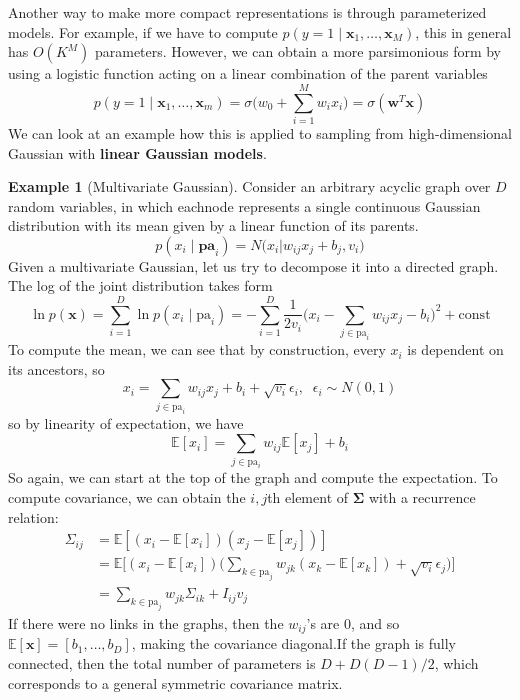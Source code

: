 \documentclass{article}
\theoremstyle{definition}
\newtheorem{example}{Example}[section]
\theoremstyle{remark}
\theoremstyle{definition}
\begin{document}
      Another way to make more compact representations is through parameterized models. For example, if we have to compute $p(y = 1 \mid \mathbf{x}_1, \ldots, \mathbf{x}_M)$, this in general has $O(K^M)$ parameters. However, we can obtain a more parsimonious form by using a logistic function acting on a linear combination of the parent variables 
      \[p(y = 1 \mid \mathbf{x}_1, \ldots, \mathbf{x}_m) = \sigma \bigg( w_0 + \sum_{i=1}^M w_i x_i \bigg) = \sigma(\mathbf{w}^T \mathbf{x}) \]
      We can look at an example how this is applied to sampling from high-dimensional Gaussian with \textbf{linear Gaussian models}.  


      \begin{example}[Multivariate Gaussian]
      Consider an arbitrary acyclic graph over $D$ random variables, in which eachnode represents a single continuous Gaussian distribution with its mean given by a linear function of its parents. 
      \[p(x_i \mid \mathbf{pa}_i) = N \bigg( x_i \bigg| w_{ij} x_j + b_j, v_i \bigg) \]
      Given a multivariate Gaussian, let us try to decompose it into a directed graph. The log of the joint distribution takes form 
      \[\ln p(\mathbf{x}) = \sum_{i=1}^D \ln p(x_i \mid \mathrm{pa}_i) = - \sum_{i=1}^D \frac{1}{2 v_i} \bigg( x_i - \sum_{j \in \mathrm{pa}_i} w_{ij} x_j - b_i \bigg)^2 + \mathrm{const}\]
      To compute the mean, we can see that by construction, every $x_i$ is dependent on its ancestors, so 
      \[x_i = \sum_{j \in \mathrm{pa}_i} w_{ij} x_j + b_i + \sqrt{v_i} \epsilon_i, \;\; \epsilon_i \sim N(0, 1)\]
      so by linearity of expectation, we have 
      \[\mathbb{E}[x_i] = \sum_{j \in \mathrm{pa}_i} w_{ij} \mathbb{E}[x_j] + b_i\]
      So again, we can start at the top of the graph and compute the expectation. To compute covariance, we can obtain the $i, j$th element of $\boldsymbol{\Sigma}$ with a recurrence relation: 
      \begin{align*} 
        \Sigma_{ij} & = \mathbb{E}[ (x_i - \mathbb{E}[x_i]) (x_j - \mathbb{E}[x_j])] \\
                    & = \mathbb{E} \bigg[ (x_i - \mathbb{E}[x_i]) \bigg( \sum_{k \in \mathrm{pa}_j} w_{j k} (x_k - \mathbb{E}[x_k])  + \sqrt{v_i} \epsilon_j\bigg) \bigg] \\
                    & = \sum_{k \in \mathrm{pa}_j} w_{j k} \Sigma_{ik} + I_{ij} v_j
      \end{align*}
      If there were no links in the graphs, then the $w_{ij}$'s are $0$, and so $\mathbb{E}[\mathbf{x}] = [b_1, \ldots, b_D]$, making the covariance diagonal.If the graph is fully connected, then the total number of parameters is $D + D(D-1)/2$, which corresponds to a general symmetric covariance matrix.  
      \end{example}
\end{document}
